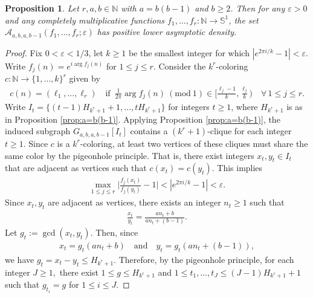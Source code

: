 \documentclass[12pt, reqno, a4paper]{amsart}
\newtheorem{proposition}{Proposition}[section]
\theoremstyle{definition}
\theoremstyle{remark}
\numberwithin{equation}{section}
\newcommand{\Mod}[1]{\ (\mathrm{mod}\ #1)}
\renewcommand{\leq}{\leqslant}
\renewcommand{\geq}{\geqslant}
\begin{document}
\begin{proposition}
Let \( r, a, b \in \mathbb{N} \) with \( a = b(b - 1) \) and \( b \geq 2 \). Then for any \( \varepsilon > 0 \) and any completely multiplicative functions \( f_1, \ldots, f_r : \mathbb{N} \to \mathbb{S}^1 \), the set \( \mathcal{A}_{a,b,a,b-1}(f_1, \ldots, f_r; \varepsilon) \) has positive lower asymptotic density.

\end{proposition}
 \begin{proof}
     Fix $0<\varepsilon<1/3$, let $k\geq 1$ be the smallest integer for which $|e^{2\pi i/k}-1| < \varepsilon$. Write $f_j(n) = e^{i \arg f_j(n)}$ for $1 \leq j \leq r.$ Consider the $k^r$-coloring $c:\mathbb{N} \to \{1, \ldots,k \}^r$ given by
     \begin{align*}
 c(n) = (\ell_1, \ldots, \ell_r) \quad\text{if } \, \frac{1}{2\pi}\arg f_j(n) \Mod{1}  \in \bigg[\frac{\ell_j-1}{k}, \frac{\ell_j}{k} \bigg) \quad \forall \, 1\leq j \leq r.
     \end{align*}
Write $I_t=\{ (t-1)H_{k^r+1}+1, \ldots, tH_{k^r+1} \}$ for integers $t \geq 1$, where $H_{k^{r}+1}$ is as in Proposition \ref{prop:a=b(b-1)}. Applying Proposition \ref{prop:a=b(b-1)}, the induced subgraph 
    $G_{a,b,a,b-1}[I_t]$ contains a $(k^r+1)$-clique for each integer $t \geq 1.$ Since $c$ is a $k^{r}$-coloring, at least two vertices of these cliques must share the same color by the pigeonhole principle. That is, there exist integers $x_t, y_t \in I_t$ that are adjacent as vertices such that $c(x_t)=c(y_t)$. This implies
    \begin{align} \label{eq:xtyt}
   \max_{1 \leq j \leq r}  \bigg| \frac{f_j(x_t)}{f_j(y_t)} -1 \bigg| < | e^{2\pi i/k} -1| < \varepsilon. 
    \end{align}
  Since $x_t, y_t$ are adjacent as vertices, there exists an integer $n_t \geq 1$ such that
  \begin{align} \label{eq:ntnt}
   \frac{x_t}{y_t} = \frac{an_t + b}{an_t+(b-1)}. 
  \end{align}
Let $g_t:=\operatorname{gcd}(x_t, y_t).$ Then, since
\begin{align} \label{eq:gta}
 x_t = g_t(an_t+b)  \quad \text{and} \quad y_t = g_t(an_t + (b-1)),
\end{align} 
 we have $g_t=x_t-y_t \leq H_{k^r+1}$. Therefore, by the pigeonhole principle, for each integer $J \geq 1,$  there exist $1 \leq g \leq H_{k^r+1}$ and $1 \leq t_1, \ldots, t_J \leq (J-1)H_{k^r+1}+1$ such that $g_{t_i}=g$ for $1 \leq i \leq J.$

\end{proof}
\end{document}
